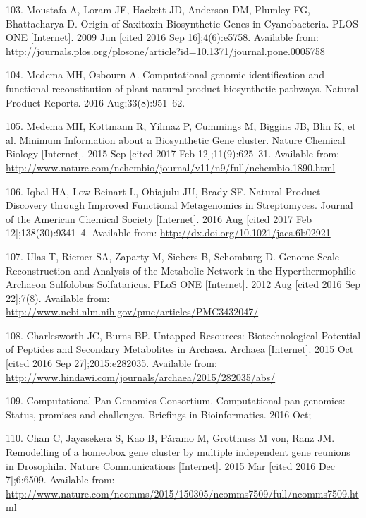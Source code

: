 \documentclass[12pt,twoside]{reedthesis}
\begin{document}
  \hypertarget{ref-moustafa_origin_2009}{}
  103. Moustafa A, Loram JE, Hackett JD, Anderson DM, Plumley FG,
  Bhattacharya D. Origin of Saxitoxin Biosynthetic Genes in Cyanobacteria.
  PLOS ONE {[}Internet{]}. 2009 Jun {[}cited 2016 Sep 16{]};4(6):e5758.
  Available from:
  \url{http://journals.plos.org/plosone/article?id=10.1371/journal.pone.0005758}
  
  \hypertarget{ref-medema_computational_2016}{}
  104. Medema MH, Osbourn A. Computational genomic identification and
  functional reconstitution of plant natural product biosynthetic
  pathways. Natural Product Reports. 2016 Aug;33(8):951--62.
  
  \hypertarget{ref-medema_minimum_2015}{}
  105. Medema MH, Kottmann R, Yilmaz P, Cummings M, Biggins JB, Blin K, et
  al. Minimum Information about a Biosynthetic Gene cluster. Nature
  Chemical Biology {[}Internet{]}. 2015 Sep {[}cited 2017 Feb
  12{]};11(9):625--31. Available from:
  \url{http://www.nature.com/nchembio/journal/v11/n9/full/nchembio.1890.html}
  
  \hypertarget{ref-iqbal_natural_2016}{}
  106. Iqbal HA, Low-Beinart L, Obiajulu JU, Brady SF. Natural Product
  Discovery through Improved Functional Metagenomics in Streptomyces.
  Journal of the American Chemical Society {[}Internet{]}. 2016 Aug
  {[}cited 2017 Feb 12{]};138(30):9341--4. Available from:
  \url{http://dx.doi.org/10.1021/jacs.6b02921}
  
  \hypertarget{ref-ulas_genome-scale_2012}{}
  107. Ulas T, Riemer SA, Zaparty M, Siebers B, Schomburg D. Genome-Scale
  Reconstruction and Analysis of the Metabolic Network in the
  Hyperthermophilic Archaeon Sulfolobus Solfataricus. PLoS ONE
  {[}Internet{]}. 2012 Aug {[}cited 2016 Sep 22{]};7(8). Available from:
  \url{http://www.ncbi.nlm.nih.gov/pmc/articles/PMC3432047/}
  
  \hypertarget{ref-charlesworth_untapped_2015}{}
  108. Charlesworth JC, Burns BP. Untapped Resources: Biotechnological
  Potential of Peptides and Secondary Metabolites in Archaea. Archaea
  {[}Internet{]}. 2015 Oct {[}cited 2016 Sep 27{]};2015:e282035. Available
  from: \url{http://www.hindawi.com/journals/archaea/2015/282035/abs/}
  
  \hypertarget{ref-computational_pan-genomics_consortium_computational_2016}{}
  109. Computational Pan-Genomics Consortium. Computational pan-genomics:
  Status, promises and challenges. Briefings in Bioinformatics. 2016 Oct;
  
  \hypertarget{ref-chan_remodelling_2015}{}
  110. Chan C, Jayasekera S, Kao B, Páramo M, Grotthuss M von, Ranz JM.
  Remodelling of a homeobox gene cluster by multiple independent gene
  reunions in Drosophila. Nature Communications {[}Internet{]}. 2015 Mar
  {[}cited 2016 Dec 7{]};6:6509. Available from:
  \url{http://www.nature.com/ncomms/2015/150305/ncomms7509/full/ncomms7509.html}
  
\end{document}
